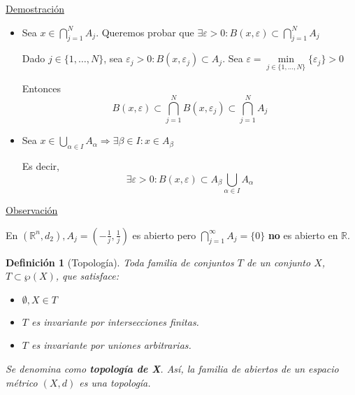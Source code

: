 \documentclass[10pt,a4paper,openright]{book}
\theoremstyle{break}
\newtheorem*{defi}{Definición}
\begin{document}
\underline{Demostración}

\begin{itemize}
\item Sea $x \in \displaystyle\bigcap_{j=1}^N A_j$. Queremos probar que $\exists \varepsilon > 0 : B(x,\varepsilon) \subset \displaystyle\bigcap_{j=1}^N A_j$

Dado $j \in \{1, \ldots , N\}$, sea $\varepsilon_j > 0 : B(x,\varepsilon_j) \subset A_j$. Sea $\varepsilon = \underset{j \in \{1, \ldots , N\}}{\min}\{\varepsilon_j\} > 0$

Entonces $$B(x,\varepsilon) \subset \bigcap_{j=1}^N B(x,\varepsilon_j)\subset  \bigcap_{j=1}^N A_j$$


\item Sea $x \in \displaystyle\bigcup_{\alpha \in I} A_\alpha \Rightarrow \exists \beta \in I : x \in A_\beta $ 

Es decir, $$\exists \varepsilon > 0 : B(x, \varepsilon) \subset A_\beta \bigcup_{\alpha \in I} A_\alpha$$
\end{itemize}

\underline{Observación}

En $(\mathbb{R}^n, d_2), A_j=(-\frac{1}{j}, \frac{1}{j})$ es abierto pero $\displaystyle\bigcap_{j=1}^\infty A_j = \{0\}$  \textbf{no} es abierto en $\mathbb{R}$.

\begin{defi}[Topología]


Toda familia de conjuntos $T$ de un conjunto $X$, $T \subset \wp (X)$, que satisface:
\begin{itemize}
\item $\emptyset, X \in T$

\item $T$ es invariante por intersecciones finitas.

\item $T$ es invariante por uniones arbitrarias.
\end{itemize}

Se denomina como \textbf{topología de X}. Así, la familia de abiertos de un espacio métrico $(X,d)$ es una topología.
\end{defi}
\end{document}
